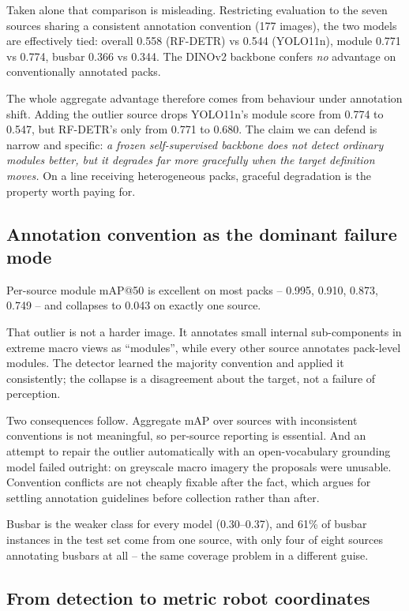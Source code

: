 \documentclass[conference]{IEEEtran}
\begin{document}
Taken alone that comparison is misleading. Restricting evaluation to the seven
sources sharing a consistent annotation convention (177 images), the two models are
effectively tied: overall 0.558 (RF-DETR) vs 0.544 (YOLO11n), module 0.771 vs 0.774,
busbar 0.366 vs 0.344. The DINOv2 backbone confers \emph{no} advantage on
conventionally annotated packs.

The whole aggregate advantage therefore comes from behaviour under annotation shift.
Adding the outlier source drops YOLO11n's module score from 0.774 to 0.547, but
RF-DETR's only from 0.771 to 0.680. The claim we can defend is narrow and specific:
\emph{a frozen self-supervised backbone does not detect ordinary modules better, but
it degrades far more gracefully when the target definition moves.} On a line
receiving heterogeneous packs, graceful degradation is the property worth paying for.

\subsection{Annotation convention as the dominant failure mode}
\label{sec:convention}

Per-source module mAP@50 is excellent on most packs -- 0.995, 0.910, 0.873, 0.749 --
and collapses to 0.043 on exactly one source.

That outlier is not a harder image. It annotates small internal sub-components in
extreme macro views as ``modules'', while every other source annotates pack-level
modules. The detector learned the majority convention and applied it consistently;
the collapse is a disagreement about the target, not a failure of perception.

Two consequences follow. Aggregate mAP over sources with inconsistent conventions is
not meaningful, so per-source reporting is essential. And an attempt to repair the
outlier automatically with an open-vocabulary grounding model failed outright: on
greyscale macro imagery the proposals were unusable. Convention conflicts are not
cheaply fixable after the fact, which argues for settling annotation guidelines
before collection rather than after.

Busbar is the weaker class for every model (0.30--0.37), and 61\% of busbar instances
in the test set come from one source, with only four of eight sources annotating
busbars at all -- the same coverage problem in a different guise.

\subsection{From detection to metric robot coordinates}
\label{sec:localisation}
\end{document}
